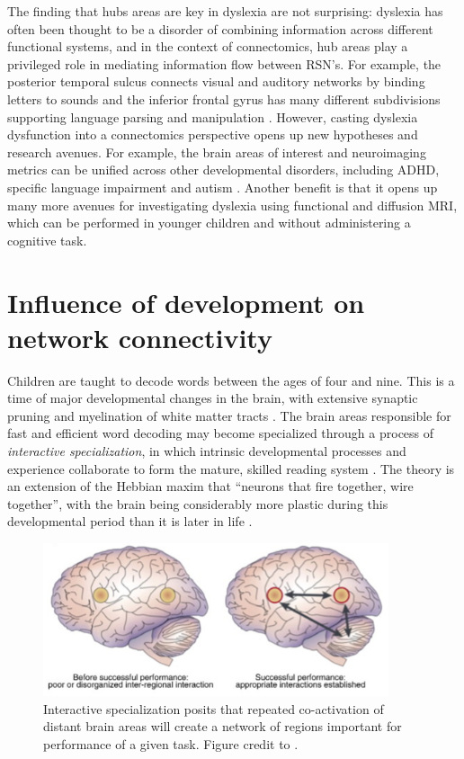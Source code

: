 The finding that hubs areas are key in dyslexia are not surprising: dyslexia has often been thought to be a disorder of combining information across different functional systems, and in the context of connectomics, hub areas play a privileged role in mediating information flow between RSN’s. For example, the posterior temporal sulcus connects visual and auditory networks by binding letters to sounds \citep{Blau2010, VanAtteveldt2009} and the inferior frontal gyrus has many different subdivisions supporting language parsing and manipulation \citep{Hagoort2005}. However, casting dyslexia dysfunction into a connectomics perspective opens up new hypotheses and research avenues. For example, the brain areas of interest and neuroimaging metrics can be unified across other developmental disorders, including ADHD, specific language impairment and autism \citep{Stam2014}. Another benefit is that it opens up many more avenues for investigating dyslexia using functional and diffusion MRI, which can be performed in younger children and without administering a cognitive task. 


\section{Influence of development on network connectivity}

Children are taught to decode words between the ages of four and nine. This is a time of major developmental changes in the brain, with extensive synaptic pruning and myelination of white matter tracts \citep{Wandell2013}. The brain areas responsible for fast and efficient word decoding may become specialized through a process of \textit{interactive specialization}, in which intrinsic developmental processes and experience collaborate to form the mature, skilled reading system \citep{Johnson2011, Klingberg2014}. The theory is an extension of the Hebbian maxim that ``neurons that fire together, wire together'', with the brain being considerably more plastic during this developmental period than it is later in life \citep{Hebb1949}.

\begin{figure}[t]
    \centering
    \includegraphics[width=4in]{images/ch1-interactive-specialization.jpg}
        \caption[Interactive specialization explains changes in activity.]{Interactive specialization posits that repeated co-activation of distant brain areas will create a network of regions important for performance of a given task. Figure credit to \citep{Gaffrey2013}.}
    \label{fig:ch1-interactive-specialization}
\end{figure}

